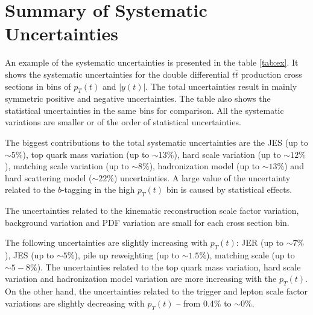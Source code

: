 \section{Summary of Systematic Uncertainties}

An example of the systematic uncertainties is presented in the table \ref{tab:ex}. It shows the 
systematic uncertainties for the double differential $t\bar{t}$ production cross sections in bins of $p_{T}(t)$ and $|y(t)|$.
The total uncertainties result in mainly symmetric positive and negative uncertainties.
The table also shows the statistical uncertainties in the same bins for comparison. All the systematic variations are smaller
or of the order of statistical uncertainties.

The biggest contributions to the total systematic uncertainties are the JES (up to $\sim 5\%$), top quark mass variation (up to
$\sim 13\%$), hard scale variation (up to $\sim 12\%$), matching scale variation (up to $\sim 8\%$), hadronization model
(up to $\sim 13\%$) and hard scattering model ($\sim 22\%$) uncertainties. A large value of the uncertainty related to the $b$-tagging 
in the high $p_{T}(t)$ bin is caused by statistical effects.

The uncertainties related to the kinematic reconstruction scale factor variation, background variation and PDF variation are 
small for each cross section bin.

The following uncertainties are slightly increasing with $p_{T}(t)$: JER (up to $\sim 7\%$), JES (up to $\sim 5\%$), pile up
reweighting (up to $\sim 1.5\%$), matching scale (up to $\sim 5-8\%$). The uncertainties related to the top quark mass variation,
hard scale variation and hadronization model variation are more increasing with the $p_{T}(t)$. On the other hand, the uncertainties
related to the trigger and lepton scale factor variations are slightly decreasing with $p_{T}(t)$ -- from 0.4\% to $\sim0\%$.



